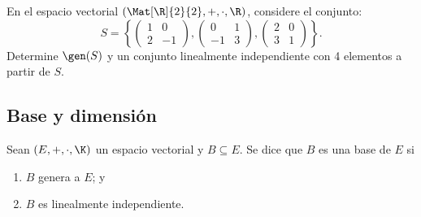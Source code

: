\documentclass[compacto,10pt]{pubciencias-notas}
\begin{document}
\begin{ejer}\hspace{0pt}
En el espacio vectorial $(\Mat[\R]{2}{2},+,\cdot,\R)$, considere el conjunto:
\[
S=\left\lbrace 
\begin{pmatrix}
1&0\\
2&-1
\end{pmatrix},
\begin{pmatrix}
0&1\\
-1&3
\end{pmatrix},
\begin{pmatrix}
2&0\\
3&1
\end{pmatrix}
\right\rbrace.
\]
Determine $\gen(S)$ y un conjunto linealmente independiente con 4 elementos a partir de $S$.
\end{ejer}


\setcounter{subsection}{6}
\subsection{Base y dimensión}

\begin{defi}
    Sean $(E,+,\cdot,\K)$ un espacio vectorial y $B\subseteq E$. Se dice que $B$ es una base de $E$ si 
    \begin{enumerate}
        \item $B$ genera a $E$; y 
        \item $B$ es linealmente independiente. 
    \end{enumerate}
    
\end{defi}
\end{document}
